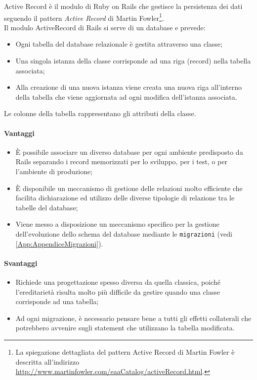 \label{sec:ActiveRecord}
Active Record è il modulo di Ruby on Rails che gestisce la persistenza dei dati seguendo il pattern \textit{Active Record }di   %
Martin Fowler\footnote{La spiegazione dettagliata del pattern Active Record di Martin Fowler è descritta all'indirizzo \url{http://www.martinfowler.com/eaaCatalog/activeRecord.html}. }. \\
Il modulo ActiveRecord di Rails si serve di un database e prevede:
\begin{itemize}
\item Ogni tabella del database relazionale è gestita attraverso una classe;
\item Una singola istanza della classe corrisponde ad una riga (record) nella tabella associata;
\item Alla creazione di una nuova istanza viene creata una nuova riga all'interno della tabella che viene aggiornata ad ogni modifica dell'istanza associata.
\end{itemize}
Le colonne della tabella rappresentano gli attributi della classe.

\paragraph{Vantaggi} 
\begin{itemize}
	\item È possibile associare un diverso database per ogni ambiente predisposto da Rails separando i record memorizzati per lo sviluppo, per i test, o per l'ambiente di produzione;
	\item È disponibile un meccanismo di gestione delle relazioni molto efficiente che facilita dichiarazione ed utilizzo delle diverse tipologie di relazione tra le tabelle del database;
	\item Viene messo a disposizione un meccanismo specifico per la gestione dell'evoluzione dello schema del database mediante le \texttt{migrazioni} (vedi \autoref{App:AppendiceMigrazioni}). 
\end{itemize} 
\paragraph{Svantaggi}
\begin{itemize}
	\item Richiede una progettazione spesso diversa da quella classica, poiché l'ereditarietà risulta molto più difficile da gestire quando una classe corrisponde ad una tabella;
	\item Ad ogni migrazione, è necessario pensare bene a tutti gli effetti collaterali che potrebbero avvenire sugli statement che utilizzano la tabella modificata.
\end{itemize} 

